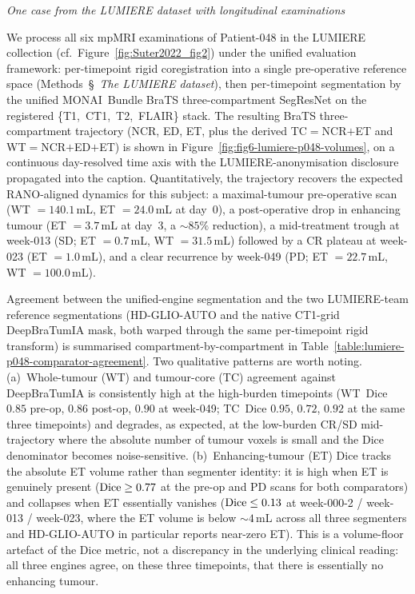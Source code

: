 \documentclass[a4paper,11pt,leqno]{article}
\begin{document}
\newpage

\noindent \emph{One case from the LUMIERE dataset with longitudinal examinations}

\vspace{2mm}

We process all six mpMRI examinations of Patient-048 in the
LUMIERE collection (cf.\ Figure~\ref{fig:Suter2022_fig2}) under the
unified evaluation framework: per-timepoint rigid coregistration into
a single pre-operative reference space (Methods~\S~\emph{The LUMIERE
dataset}), then per-timepoint segmentation by the unified
MONAI~Bundle BraTS three-compartment SegResNet on the registered
\{T1,~CT1,~T2,~FLAIR\} stack. The resulting BraTS three-compartment
trajectory (NCR, ED, ET, plus the derived TC$=$NCR$+$ET and
WT$=$NCR$+$ED$+$ET) is shown in
Figure~\ref{fig:fig6-lumiere-p048-volumes}, on a continuous
day-resolved time axis with the LUMIERE-anonymisation disclosure
propagated into the caption. Quantitatively, the trajectory recovers
the expected RANO-aligned dynamics for this subject: a maximal-tumour
pre-operative scan (WT $=140.1$\,mL, ET $=24.0$\,mL at day~0), a
post-operative drop in enhancing tumour (ET $=3.7$\,mL at day~3, a
$\sim\!85\%$ reduction), a mid-treatment trough at week-013 (SD;
ET $=0.7$\,mL, WT $=31.5$\,mL) followed by a CR plateau at week-023
(ET $=1.0$\,mL), and a clear recurrence by week-049 (PD;
ET $=22.7$\,mL, WT $=100.0$\,mL).

Agreement between the unified-engine segmentation and the two
LUMIERE-team reference segmentations (HD-GLIO-AUTO and the native
CT1-grid DeepBraTumIA mask, both warped through the same per-timepoint
rigid transform) is summarised compartment-by-compartment in
Table~\ref{table:lumiere-p048-comparator-agreement}. Two qualitative
patterns are worth noting. (a)~Whole-tumour (WT) and tumour-core (TC)
agreement against DeepBraTumIA is consistently high at the
high-burden timepoints (WT~Dice $0.85$ pre-op, $0.86$ post-op, $0.90$
at week-049; TC~Dice $0.95$, $0.72$, $0.92$ at the same three
timepoints) and degrades, as expected, at the low-burden CR/SD
mid-trajectory where the absolute number of tumour voxels is small
and the Dice denominator becomes noise-sensitive. (b)~Enhancing-tumour
(ET) Dice tracks the absolute ET volume rather than segmenter
identity: it is high when ET is genuinely present
(${\rm Dice} \geq 0.77$ at the pre-op and PD scans for both
comparators) and collapses when ET essentially vanishes
(${\rm Dice} \leq 0.13$ at week-000-2 / week-013 / week-023, where
the ET volume is below $\sim\!4$\,mL across all three segmenters and
HD-GLIO-AUTO in particular reports near-zero ET). This is a
volume-floor artefact of the Dice metric, not a discrepancy in the
underlying clinical reading: all three engines agree, on these three
timepoints, that there is essentially no enhancing tumour.
\end{document}

